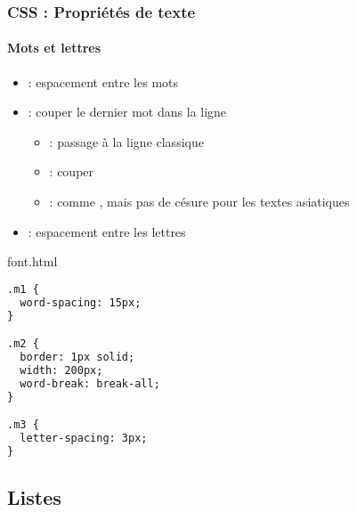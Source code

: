 \documentclass[xcolor=table]{beamer}
\begin{document}
\begin{frame}[fragile]
\frametitle{CSS : Propriétés de texte}
\framesubtitle{Mots et lettres}

\begin{minipage}{0.60\textwidth}
	\begin{itemize}
		\item {} : espacement entre les mots
		\item {} : couper le dernier mot dans la ligne
		\begin{itemize}
			\item {} : passage à la ligne classique
			\item {} : couper
			\item {} : comme , mais pas de césure pour les textes asiatiques
		\end{itemize}
		\item {} : espacement entre les lettres
	\end{itemize}
\end{minipage}
%
\begin{minipage}{0.38\textwidth}
\begin{exampleblock}{font.html}
\lstset{escapeinside=**}
\scriptsize\bfseries
\begin{lstlisting}[language={html}]
.m1 {
  word-spacing: 15px;
}

.m2 {
  border: 1px solid;
  width: 200px;
  word-break: break-all;
}

.m3 {
  letter-spacing: 3px;
}
\end{lstlisting}
\end{exampleblock}
\end{minipage}
\end{frame}

\subsection{Listes}
\end{document}
